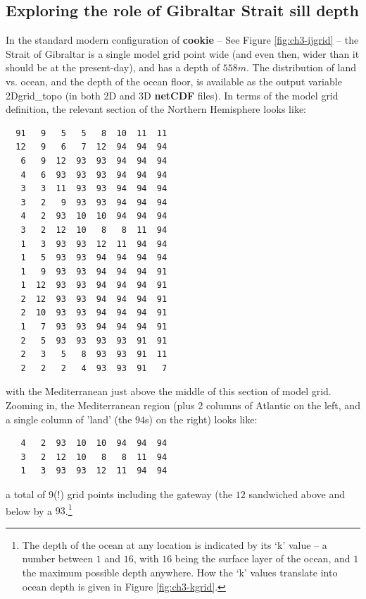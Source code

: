 \newpage

\subsection{Exploring the role of Gibraltar Strait sill depth}

In the standard modern configuration of \textbf{cookie} -- See Figure \ref{fig:ch3-ijgrid} -- the Strait of Gibraltar is a single model grid point wide (and even then, wider than it should be at the present-day), and has a depth of $558 m$. The distribution of land vs. ocean, and the depth of the ocean floor, is available as the output variable \textsf{\footnotesize 2Dgrid\_topo} (in both 2D and 3D \textbf{netCDF} files). In terms of the model grid definition, the relevant section of the Northern Hemisphere looks like:

\vspace{-2mm}\footnotesize\begin{verbatim}
  91   9   5   5   8  10  11  11
  12   9   6   7  12  94  94  94
   6   9  12  93  93  94  94  94
   4   6  93  93  93  94  94  94
   3   3  11  93  93  94  94  94
   3   2   9  93  93  94  94  94
   4   2  93  10  10  94  94  94
   3   2  12  10   8   8  11  94
   1   3  93  93  12  11  94  94
   1   5  93  93  94  94  94  94
   1   9  93  93  94  94  94  91
   1  12  93  93  94  94  94  91
   2  12  93  93  94  94  94  91
   2  10  93  93  94  94  94  91
   1   7  93  93  94  94  94  91
   2   5  93  93  93  93  91  91
   2   3   5   8  93  93  91  11
   2   2   2   4  93  93  91   7
\end{verbatim}\normalsize\vspace{-2mm}
with the Mediterranean just above the middle of this section of model grid. Zooming in, the Mediterranean region (plus 2 columns of Atlantic on the left, and a single column of 'land' (the $94$s) on the right) looks like:

\vspace{-2mm}\small\begin{verbatim}
   4   2  93  10  10  94  94  94
   3   2  12  10   8   8  11  94
   1   3  93  93  12  11  94  94
\end{verbatim}\normalsize\vspace{-2mm}
a total of 9(!) grid points including the gateway (the $12$ sandwiched above and below by a $93$.\footnote{The depth of the ocean at any location is indicated by its ‘k’ value – a number between $1$ and $16$, with $16$ being the surface layer of the ocean, and $1$ the maximum possible depth anywhere. How the ‘k’ values translate into ocean depth is given in Figure \ref{fig:ch3-kgrid}.} 

